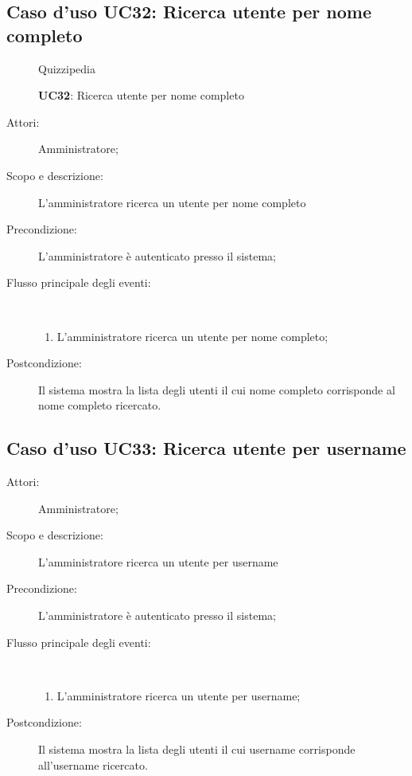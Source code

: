 \subsection{Caso d'uso UC32: Ricerca utente per nome completo}
\begin{figure}[H]
	\centering
	\begin{resizedtikzpicture}{\textwidth}
		\begin{umlsystem}[x=0, fill=lightgray!20]{Quizzipedia}
		\end{umlsystem}
	\end{resizedtikzpicture}
	\caption{\textbf{UC32}: Ricerca utente per nome completo}
	\label{UC32}
\end{figure}
\begin{description}
	\item[Attori:] Amministratore;
	\item[Scopo e descrizione:] L'amministratore ricerca un utente per nome completo
	\item[Precondizione:] L'amministratore è autenticato presso il sistema;
	
	\item[Flusso principale degli eventi:] \ 
	\begin{enumerate}
		\item L'amministratore ricerca un utente per nome completo;
		
	\end{enumerate}
	\item[Postcondizione:] Il sistema mostra la lista degli utenti il cui nome completo corrisponde al nome completo ricercato.
\end{description}
\hypertarget{UC33}{}
\subsection{Caso d'uso UC33: Ricerca utente per username}\begin{description}
	\item[Attori:] Amministratore;
	\item[Scopo e descrizione:] L'amministratore ricerca un utente per username
	\item[Precondizione:] L'amministratore è autenticato presso il sistema;
	
	\item[Flusso principale degli eventi:] \ 
	\begin{enumerate}
		\item L'amministratore ricerca un utente per username;
		
	\end{enumerate}
	\item[Postcondizione:] Il sistema mostra la lista degli utenti il cui username corrisponde all'username ricercato.
\end{description}
\hypertarget{UC34}{}
